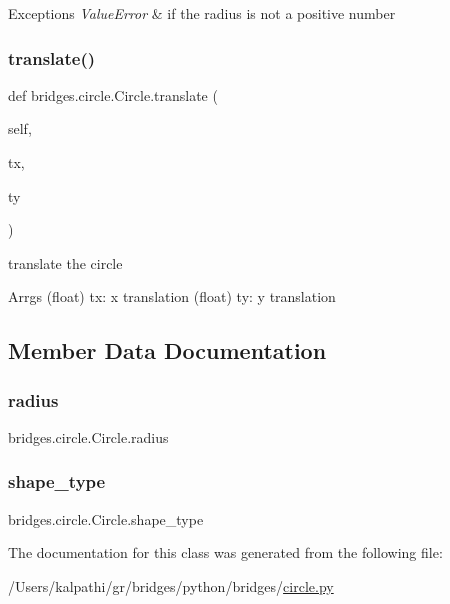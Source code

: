\begin{DoxyExceptions}{Exceptions}
{\em Value\+Error} & if the radius is not a positive number \\
\hline
\end{DoxyExceptions}
\mbox{\label{classbridges_1_1circle_1_1_circle_abe8b18df0025d5d9cca88baf05dfc9ad}} 
\subsubsection{\texorpdfstring{translate()}{translate()}}
{\footnotesize\ttfamily def bridges.\+circle.\+Circle.\+translate (\begin{DoxyParamCaption}\item[{}]{self,  }\item[{float}]{tx,  }\item[{float}]{ty }\end{DoxyParamCaption})}



translate the circle 

\begin{DoxyParagraph}{Arrgs}
(float) tx\+: x translation (float) ty\+: y translation 
\end{DoxyParagraph}


\subsection{Member Data Documentation}
\mbox{\label{classbridges_1_1circle_1_1_circle_ab52ae32c28ea4175b815a7b04491205b}} 
\subsubsection{\texorpdfstring{radius}{radius}}
{\footnotesize\ttfamily bridges.\+circle.\+Circle.\+radius}

\mbox{\label{classbridges_1_1circle_1_1_circle_a34d318970485d12445ce43225b81428e}} 
\subsubsection{\texorpdfstring{shape\_type}{shape\_type}}
{\footnotesize\ttfamily bridges.\+circle.\+Circle.\+shape\+\_\+type}



The documentation for this class was generated from the following file\+:\begin{DoxyCompactItemize}
\item 
/\+Users/kalpathi/gr/bridges/python/bridges/\mbox{\hyperlink{circle_8py}{circle.\+py}}\end{DoxyCompactItemize}
